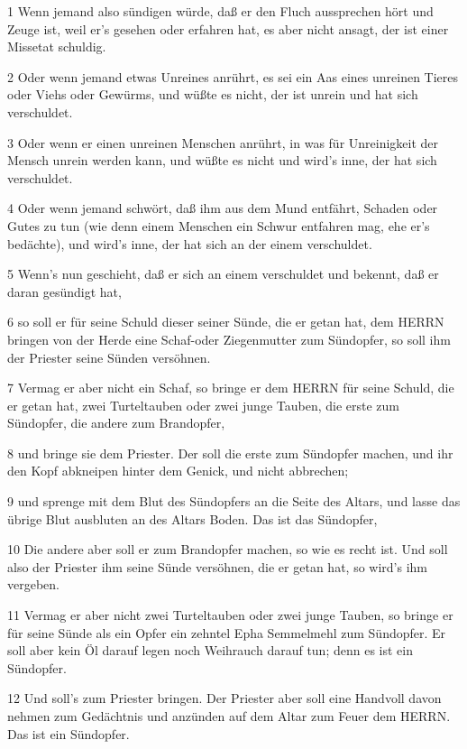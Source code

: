 \par 1 Wenn jemand also sündigen würde, daß er den Fluch aussprechen hört und Zeuge ist, weil er's gesehen oder erfahren hat, es aber nicht ansagt, der ist einer Missetat schuldig.
\par 2 Oder wenn jemand etwas Unreines anrührt, es sei ein Aas eines unreinen Tieres oder Viehs oder Gewürms, und wüßte es nicht, der ist unrein und hat sich verschuldet.
\par 3 Oder wenn er einen unreinen Menschen anrührt, in was für Unreinigkeit der Mensch unrein werden kann, und wüßte es nicht und wird's inne, der hat sich verschuldet.
\par 4 Oder wenn jemand schwört, daß ihm aus dem Mund entfährt, Schaden oder Gutes zu tun (wie denn einem Menschen ein Schwur entfahren mag, ehe er's bedächte), und wird's inne, der hat sich an der einem verschuldet.
\par 5 Wenn's nun geschieht, daß er sich an einem verschuldet und bekennt, daß er daran gesündigt hat,
\par 6 so soll er für seine Schuld dieser seiner Sünde, die er getan hat, dem HERRN bringen von der Herde eine Schaf-oder Ziegenmutter zum Sündopfer, so soll ihm der Priester seine Sünden versöhnen.
\par 7 Vermag er aber nicht ein Schaf, so bringe er dem HERRN für seine Schuld, die er getan hat, zwei Turteltauben oder zwei junge Tauben, die erste zum Sündopfer, die andere zum Brandopfer,
\par 8 und bringe sie dem Priester. Der soll die erste zum Sündopfer machen, und ihr den Kopf abkneipen hinter dem Genick, und nicht abbrechen;
\par 9 und sprenge mit dem Blut des Sündopfers an die Seite des Altars, und lasse das übrige Blut ausbluten an des Altars Boden. Das ist das Sündopfer,
\par 10 Die andere aber soll er zum Brandopfer machen, so wie es recht ist. Und soll also der Priester ihm seine Sünde versöhnen, die er getan hat, so wird's ihm vergeben.
\par 11 Vermag er aber nicht zwei Turteltauben oder zwei junge Tauben, so bringe er für seine Sünde als ein Opfer ein zehntel Epha Semmelmehl zum Sündopfer. Er soll aber kein Öl darauf legen noch Weihrauch darauf tun; denn es ist ein Sündopfer.
\par 12 Und soll's zum Priester bringen. Der Priester aber soll eine Handvoll davon nehmen zum Gedächtnis und anzünden auf dem Altar zum Feuer dem HERRN. Das ist ein Sündopfer.
